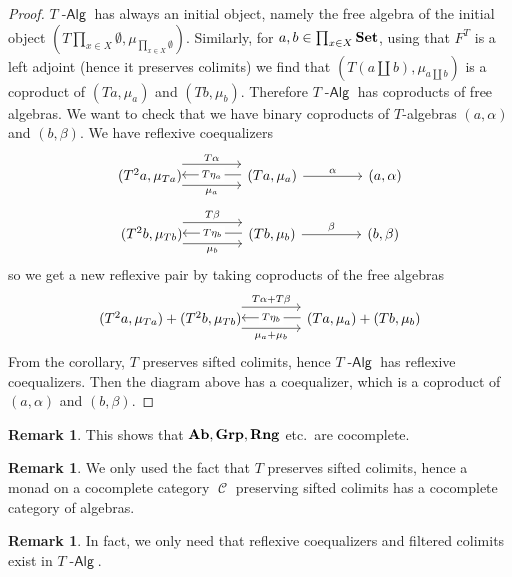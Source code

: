 \documentclass[a4paper,11pt,oneside,openany]{scrbook}
\newcommand{\catname}[1]{{\normalfont\textbf{#1}}}
\DeclareMathOperator{\Alg}{-\mathsf{Alg}}
\newcommand{\Set}{\catname{Set}}
\newcommand{\Ab}{\catname{Ab}}
\DeclareMathOperator{\C}{\mathcal{C}}
\theoremstyle{definition}
\theoremstyle{definition}
\newtheorem{rmk}[thm]{Remark}
\begin{document}
\begin{proof}
$T\Alg$ has always an initial object, namely the free algebra of the initial
    object $\left(T\prod_{x\in X}\emptyset,\mu_{\prod_{x\in
    X}\emptyset}\right)$. Similarly, for $a,b\in\prod_{x\in X}\Set$, using that
    $F^T$ is a left adjoint (hence it preserves colimits) we find that
    $\left(T\left(a\coprod b\right),\mu_{a\coprod b}\right)$ is a coproduct of
    $(Ta,\mu_a)$ and $(Tb,\mu_b)$. Therefore $T\Alg$ has coproducts of free
    algebras. We want to check that we have binary coproducts of $T$-algebras
    $(a,\alpha)$ and $(b,\beta)$. We have reflexive coequalizers
\[
\begin{tikzcd}[column sep=1.5cm]
(T^2a,\mu_{Ta})\hspace{-1.5mm}\arrow[r, shift right=1.5ex, "\mu_a"']  \arrow[r, shift left=2ex, "T\alpha"] & (Ta,\mu_a)\arrow[l, shift right=.25ex, "T\eta_a"description]\arrow[r,"\alpha"]&(a,\alpha)
\end{tikzcd}
\]
\[
\begin{tikzcd}[column sep=1.5cm]
(T^2b,\mu_{Tb})\hspace{-1.5mm}\arrow[r, shift right=1.5ex, "\mu_b"']  \arrow[r, shift left=2ex, "T\beta"] & (Tb,\mu_b)\arrow[l, shift right=.25ex, "T\eta_b"description]\arrow[r,"\beta"]&(b,\beta)
\end{tikzcd}
\]
so we get a new reflexive pair by taking coproducts of the free algebras
\[
\begin{tikzcd}[column sep=1.5cm]
(T^2a,\mu_{Ta})+(T^2b,\mu_{Tb})\hspace{-1.5mm}\arrow[r, shift right=1.5ex, "\mu_a+\mu_b"']  \arrow[r, shift left=2ex, "T\alpha+T\beta"] & (Ta,\mu_a)+(Tb,\mu_b)\arrow[l, shift right=.25ex, "T\eta_b"description]
\end{tikzcd}
\]
From the corollary, $T$ preserves sifted colimits, hence $T\Alg$ has reflexive coequalizers. Then the diagram above has a coequalizer, which is a coproduct of $(a,\alpha)$ and $(b,\beta)$. 
\end{proof}
\begin{rmk}
	This shows that $\Ab,\mathbf{Grp},\mathbf{Rng}$ etc.\ are cocomplete.
\end{rmk}
\begin{rmk}
	We only used the fact that $T$ preserves sifted colimits, hence a monad on a cocomplete category $\C$ preserving sifted colimits has a cocomplete category of algebras.
\end{rmk}
\begin{rmk}
	In fact, we only need that reflexive coequalizers and filtered colimits exist in $T\Alg$.
\end{rmk}
\end{document}
